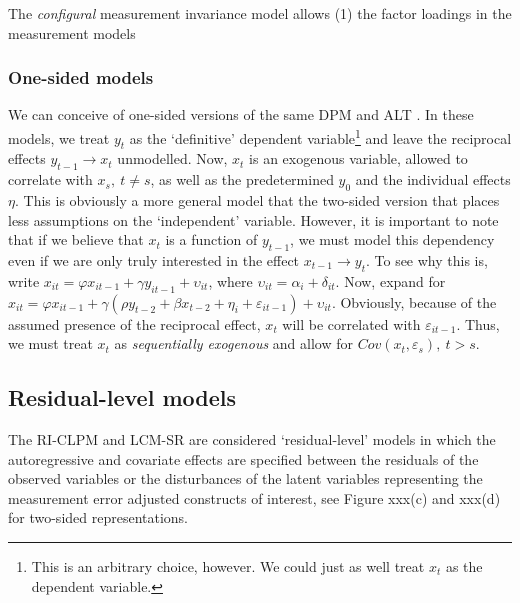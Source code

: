 \documentclass[]{interact}
\theoremstyle{plain}%
\theoremstyle{definition}
\theoremstyle{remark}
\begin{document}
The \emph{configural} measurement invariance model allows (1) the factor
loadings in the measurement models

\hypertarget{one-sided-models}{%
\subsubsection{One-sided models}\label{one-sided-models}}

We can conceive of one-sided versions of the same DPM and ALT \citep[see
for example][]{Allison2017}. In these models, we treat \(y_{t}\) as the
`definitive' dependent variable\footnote{This is an arbitrary choice,
  however. We could just as well treat \(x_{t}\) as the dependent
  variable.} and leave the reciprocal effects
\(y_{t-1} \rightarrow x_{t}\) unmodelled. Now, \(x_{t}\) is an exogenous
variable, allowed to correlate with \(x_{s}, \ t \ne s\), as well as the
predetermined \(y_{0}\) and the individual effects \(\eta\). This is
obviously a more general model that the two-sided version that places
less assumptions on the `independent' variable. However, it is important
to note that if we believe that \(x_{t}\) is a function of \(y_{t-1}\),
we must model this dependency even if we are only truly interested in
the effect \(x_{t-1} \rightarrow y_{t}\). To see why this is, write
\(x_{it} = \varphi x_{it-1} + \gamma y_{it-1} + \upsilon_{it}\), where
\(\upsilon_{it} = \alpha_{i} + \delta_{it}\). Now, expand for
\(x_{it} = \varphi x_{it-1} + \gamma (\rho y_{t-2} + \beta x_{t-2} + \eta_{i} + \varepsilon_{it-1}) + \upsilon_{it}\).
Obviously, because of the assumed presence of the reciprocal effect,
\(x_{t}\) will be correlated with \(\varepsilon_{it-1}\). Thus, we must
treat \(x_{t}\) as \emph{sequentially exogenous} and allow for
\(Cov(x_{t},\varepsilon_{s}), \ t > s\).

\hypertarget{residual-level-models}{%
\subsection{Residual-level models}\label{residual-level-models}}

The RI-CLPM and LCM-SR are considered `residual-level' models in which
the autoregressive and covariate effects are specified between the
residuals of the observed variables or the disturbances of the latent
variables representing the measurement error adjusted constructs of
interest, see Figure xxx(c) and xxx(d) for two-sided representations.
\end{document}
